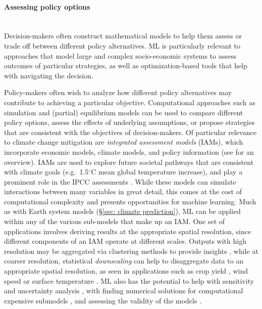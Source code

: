 \documentclass[11pt]{report}
\newcommand{\Gap}{\texorpdfstring{\hfill}{}}
\begin{document}
\paragraph*{Assessing policy options}\Gap\mbox{}\\
Decision-makers often construct mathematical models to help them assess or trade off between different policy alternatives. ML is particularly relevant to approaches that model large and complex socio-economic systems to assess outcomes of particular strategies, as well as optimization-based tools that help with navigating the decision.

Policy-makers often wish to analyze how different policy alternatives may contribute to achieving a particular objective. Computational approaches such as simulation and (partial) equilibrium models can be used to compare different policy options, assess the effects of underlying assumptions, or propose strategies that are consistent with the objectives of decision-makers.
Of particular relevance to climate change mitigation are \emph{integrated assessment models} (IAMs), which incorporate economic models, climate models, and policy information (see \cite{10.1093/reep/rew018} for an overview). IAMs are used to explore future societal pathways that are consistent with climate goals (e.g.~1.5$^{\circ}$C mean global temperature increase), and play a prominent role in the IPCC assessments \cite{moss2010iams}. 
While these models can simulate interactions between many variables in great detail, this comes at the cost of computational complexity and presents opportunities for machine learning.
Much as with Earth system models (\S\ref{sec: climate prediction}), ML can be applied within any of the various sub-models that make up an IAM. One set of applications involves deriving results at the appropriate spatial resolution, since different components of an IAM operate at different scales. Outputs with high resolution may be aggregated via clustering methods to provide insights \cite{dietrich2013reducing}, while at coarser resolution, statistical \emph{downscaling} can help to disaggregate data to an appropriate spatial resolution, as seen in applications such as crop yield \cite{folberth2019spatio}, wind speed \cite{li2019geographically} or surface temperature \cite{li2019evaluation}.
ML also has the potential to help with sensitivity and uncertainty analysis \cite{JAXAROZEN2018245}, with finding numerical solutions for computational expensive submodels \cite{scheidegger2019machine, duarte2018}, and assessing the validity of the models \cite{Mori2018}.
\end{document}
